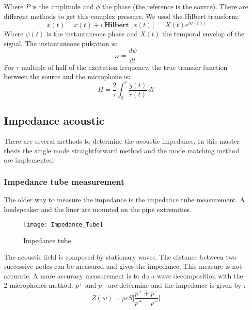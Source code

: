 Where $P$ is the amplitude and $\phi$ the phase (the reference is the source).\smallbreak
There are different methods to get this complex pressure. We used the Hilbert transform:
\begin{equation}
    \widetilde{x}(t)=x(t)+i\ \textbf{Hilbert}[x(t)]=X(t)e^{i\psi(t))}
\end{equation}
Where $\psi(t)$ is the instantaneous phase and $X(t)$ the temporal envelop of the signal. The instantaneous pulsation is:
\begin{equation}
    \omega=\frac{d\psi}{dt}
\end{equation}
For $\tau$ multiple of half of the excitation frequency, the true transfer function between the source and the microphone is:
\begin{equation}
    H=\frac{2}{\tau}\int_0^{\tau}\! \frac{y(t)}{\widetilde{r}(t)} \, dt 
\end{equation}
\subsection{Impedance acoustic}
There are several methods to determine the acoustic impedance. In this master thesis the single mode straightforward method and the mode matching method are implemented.
\subsubsection{Impedance tube measurement}
The older way to measure the impedance is the impedance tube measurement. A loudspeaker and the liner are mounted on the pipe extremities.
\begin{figure}[H] \centering
    \texttt{[image: Impedance\_Tube]}
    \caption{Impedance tube}
\end{figure}
The acoustic field is composed by stationary waves. The distance between two successive nodes can be measured and gives the impedance. This measure is not accurate. A more accuracy measurement is to do a wave decomposition with the 2-microphones method. $p^+$ and $p^-$ are determine and the impedance is given by \cite{Absorption_Coefficients_and_Impedance}: 
\begin{equation}
    Z(w)=\rho cS\Bigg[\frac{p^++p^-}{p^+-p^-}\Bigg]
\end{equation}
